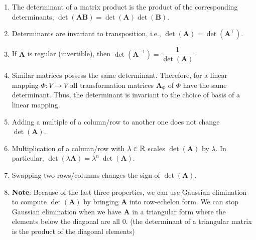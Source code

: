 \begin{enumerate}
    \item The determinant of a matrix product is the product of the corresponding determinants, $\det(\bm{AB}) = \det(\bm{A})\det(\bm{B})$.
    \hfill \cite{mfml/book/mml/Deisenroth-Faisal-Ong}

    \item Determinants are invariant to transposition, i.e., $\det(\bm{A}) = \det(\bm{A}^\top)$.
    \hfill \cite{mfml/book/mml/Deisenroth-Faisal-Ong}

    \item If $\bm{A}$ is regular (invertible), then $\det(\bm{A} ^{-1} ) = \dfrac{1} {\det(\bm{A})}$.
    \hfill \cite{mfml/book/mml/Deisenroth-Faisal-Ong}

    \item Similar matrices possess the same determinant. 
    Therefore, for a linear mapping $\Phi : V \to V$ all transformation matrices $\bm{A}_\Phi$ of $\Phi$ have the same determinant. 
    Thus, the determinant is invariant to the choice of basis of a linear mapping.
    \hfill \cite{mfml/book/mml/Deisenroth-Faisal-Ong}

    \item Adding a multiple of a column/row to another one does not change $\det(\bm{A})$.
    \hfill \cite{mfml/book/mml/Deisenroth-Faisal-Ong}

    \item Multiplication of a column/row with $\lambda \in \mathbb{R}$ scales $\det(\bm{A})$ by $\lambda$. 
    In particular, $\det(\lambda \bm{A}) = \lambda^ n \ \det(\bm{A})$.
    \hfill \cite{mfml/book/mml/Deisenroth-Faisal-Ong}

    \item Swapping two rows/columns changes the sign of $\det(\bm{A})$.
    \hfill \cite{mfml/book/mml/Deisenroth-Faisal-Ong}

    \item[] \textbf{Note}: Because of the last three properties, we can use Gaussian elimination to compute $\det(\bm{A})$ by bringing $\bm{A}$ into row-echelon form. 
    We can stop Gaussian elimination when we have $\bm{A}$ in a triangular form where the elements below the diagonal are all $0$. 
    (the determinant of a triangular matrix is the product of the diagonal elements)
\end{enumerate}









